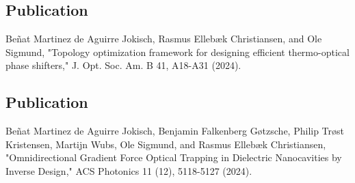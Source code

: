 \vspace*{0.4\textheight}
\begin{center}
  \begin{minipage}{0.9\linewidth}
    \section*{Publication \cite{ownpub0}}
    Beñat Martinez de Aguirre Jokisch, Rasmus Ellebæk Christiansen, and Ole Sigmund, "Topology optimization framework for designing efficient thermo-optical phase shifters," J. Opt. Soc. Am. B 41, A18-A31 (2024).
  \end{minipage}
\end{center}
\newpage


\vspace*{0.4\textheight}
\begin{center}
  \begin{minipage}{0.9\linewidth}
    \section*{Publication \cite{ownpub2}}
    Beñat Martinez de Aguirre Jokisch, Benjamin Falkenberg Gøtzsche, Philip Trøst Kristensen, Martijn Wubs, Ole Sigmund, and Rasmus Ellebæk Christiansen, "Omnidirectional Gradient Force Optical Trapping in Dielectric Nanocavities by Inverse Design," ACS Photonics 11 (12), 5118-5127 (2024).
  \end{minipage}
\end{center}
\newpage


%

